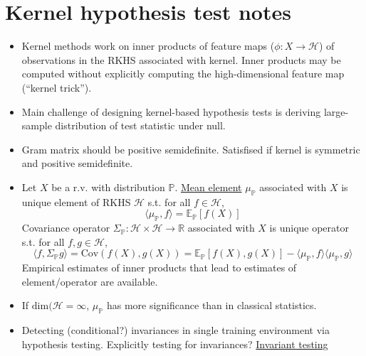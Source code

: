 \documentclass[10pt]{article}
\begin{document}
\section{Kernel hypothesis test notes}

\begin{itemize}

\item
Kernel methods work on inner products of feature maps ($\phi:X\rightarrow\mathcal{H}$) of observations in the RKHS associated with kernel. Inner products may be computed without explicitly computing the high-dimensional feature map (``kernel trick'').

\item
Main challenge of designing kernel-based hypothesis tests is deriving large-sample distribution of test statistic under null.

\item
Gram matrix should be positive semidefinite. Satisfised if kernel is symmetric and positive semidefinite.

\item
Let $X$ be a r.v. with distribution $\mathbb{P}$. \href{https://en.wikipedia.org/wiki/Kernel_embedding_of_distributions}{Mean element} $\mu_\mathbb{P}$ associated with $X$ is unique element of RKHS $\mathcal{H}$ s.t. for all $f\in\mathcal{H}$,
\[
\langle\mu_\mathbb{P},f\rangle = \mathbb{E}_\mathbb{P}[f(X)]
\]
Covariance operator $\Sigma_\mathbb{P}:\mathcal{H}\times \mathcal{H}\rightarrow\mathbb{R}$ associated with $X$ is unique operator s.t. for all $f,g\in\mathcal{H}$,
\[
\langle f, \Sigma_\mathbb{P}g\rangle = \mathrm{Cov}(f(X),g(X)) = \mathbb{E}_\mathbb{P}[f(X),g(X)] - \langle\mu_\mathbb{P},f\rangle\langle\mu_\mathbb{P},g\rangle
\]
Empirical estimates of inner products that lead to estimates of element/operator are available.

\item
If $\mathrm{dim}(\mathcal{H}=\infty$, $\mu_\mathbb{P}$ has more significance than in classical statistics.

\item
Detecting (conditional?) invariances in single training environment via hypothesis testing. Explicitly testing for invariances? \href{https://www.sciencedirect.com/science/article/pii/S0047259X03000447}{Invariant testing}

\end{itemize}
\end{document}
